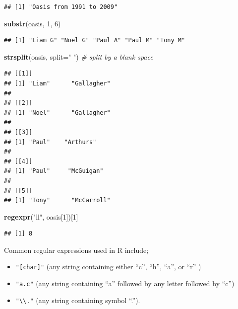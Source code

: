 \documentclass[]{book}
\newenvironment{Shaded}{\begin{snugshade}}{\end{snugshade}}
\newcommand{\KeywordTok}[1]{\textcolor[rgb]{0.13,0.29,0.53}{\textbf{{#1}}}}
\newcommand{\DataTypeTok}[1]{\textcolor[rgb]{0.13,0.29,0.53}{{#1}}}
\newcommand{\DecValTok}[1]{\textcolor[rgb]{0.00,0.00,0.81}{{#1}}}
\newcommand{\StringTok}[1]{\textcolor[rgb]{0.31,0.60,0.02}{{#1}}}
\newcommand{\CommentTok}[1]{\textcolor[rgb]{0.56,0.35,0.01}{\textit{{#1}}}}
\newcommand{\NormalTok}[1]{{#1}}
\theoremstyle{definition}
\theoremstyle{definition}
\theoremstyle{remark}
\begin{document}
\begin{verbatim}
## [1] "Oasis from 1991 to 2009"
\end{verbatim}

\begin{Shaded}
\begin{Highlighting}[]
\KeywordTok{substr}\NormalTok{(oasis, }\DecValTok{1}\NormalTok{, }\DecValTok{6}\NormalTok{)}
\end{Highlighting}
\end{Shaded}

\begin{verbatim}
## [1] "Liam G" "Noel G" "Paul A" "Paul M" "Tony M"
\end{verbatim}

\begin{Shaded}
\begin{Highlighting}[]
\KeywordTok{strsplit}\NormalTok{(oasis, }\DataTypeTok{split=}\StringTok{" "}\NormalTok{)  }\CommentTok{# split by a blank space}
\end{Highlighting}
\end{Shaded}

\begin{verbatim}
## [[1]]
## [1] "Liam"      "Gallagher"
## 
## [[2]]
## [1] "Noel"      "Gallagher"
## 
## [[3]]
## [1] "Paul"    "Arthurs"
## 
## [[4]]
## [1] "Paul"     "McGuigan"
## 
## [[5]]
## [1] "Tony"      "McCarroll"
\end{verbatim}

\begin{Shaded}
\begin{Highlighting}[]
\KeywordTok{regexpr}\NormalTok{(}\StringTok{"ll"}\NormalTok{, oasis[}\DecValTok{1}\NormalTok{])[}\DecValTok{1}\NormalTok{]}
\end{Highlighting}
\end{Shaded}

\begin{verbatim}
## [1] 8
\end{verbatim}

Common regular expressions used in R include;

\begin{itemize}
\item
  \texttt{"{[}char{]}"} (any string containing either ``c'', ``h'',
  ``a'', or ``r'' )
\item
  \texttt{"a.c"} (any string containing ``a'' followed by any letter
  followed by ``c'')
\item
  \texttt{"\textbackslash{}\textbackslash{}."} (any string containing
  symbol ``.'').
\end{itemize}
\end{document}
